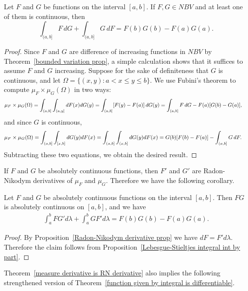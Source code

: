 \begin{proposition}\label{Lebesgue-Stieltjes integral int by part}
Let $F$ and $G$ be functions on the interval $[a,b]$. If $F,G\in NBV$ and at least one of them is continuous, then
\[\int_{(a,b]}F\,dG+\int_{(a,b]}G\,dF=F(b)G(b)-F(a)G(a).\]
\end{proposition}
\begin{proof}
Since $F$ and $G$ are difference of increasing functions in $NBV$ by Theorem~\ref{bounded variation prop}, a simple calculation shows that it suffices to assume $F$ and $G$ increasing. Suppose for the sake of definiteness that $G$ is continuous, and let $\Omega=\{(x,y):a<x\leq y\leq b\}$. We use Fubini's theorem to compute $\mu_F\times\mu_G(\Omega)$ in two ways:
\begin{equation*}\small
\begin{aligned}
\mu_F\times\mu_G(\Omega)&=\int_{(a,b]}\int_{(a,y]}dF(x)dG(y)=\int_{(a,b]}[F(y)-F(a)]\,dG(y)=\int_{(a,b]}F\,dG-F(a)[G(b)-G(a)],
\end{aligned}
\end{equation*}
and since $G$ is continuous,
\begin{equation*}\small
\begin{aligned}
\mu_F\times\mu_G(\Omega)&=\int_{(a,b]}\int_{[x,b]}dG(y)dF(x)=\int_{(a,b]}\int_{(x,b]}dG(y)dF(x)=G(b)[F(b)-F(a)]-\int_{(a,b]}G\,dF.
\end{aligned}
\end{equation*}
Subtracting these two equations, we obtain the desired result.
\end{proof}
If $F$ and $G$ be absolutely continuous functions, then $F'$ and $G'$ are Radon-Nikodym derivatives of $\mu_F$ and $\mu_G$. Therefore we have the following corollary.
\begin{corollary}
Let $F$ and $G$ be absolutely continuous functions on the interval $[a,b]$. Then $FG$ is absolutely continuous on $[a,b]$, and we have
\begin{align*}
\int_a^bFG'd\lambda+\int_a^bGF'd\lambda=F(b)G(b)-F(a)G(a).
\end{align*}
\end{corollary}
\begin{proof}
By Proposition~\ref{Radon-Nikodym derivative prop} we have $dF=F'd\lambda$. Therefore the claim follows from Proposition~\ref{Lebesgue-Stieltjes integral int by part}.
\end{proof}
Theorem~\ref{measure derivative is RN derivative} also implies the following strengthened version of Theorem~\ref{function given by integral is differentiable}.
